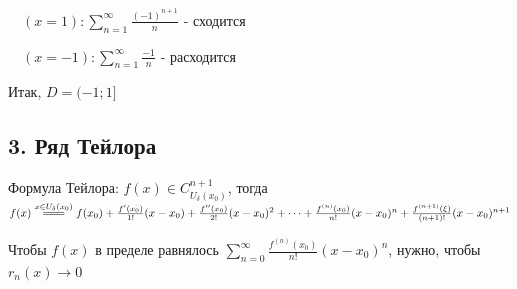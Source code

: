 \documentclass[12pt]{article}
\begin{document}
    $\quad (x = 1): \sum_{n = 1}^\infty \frac{(-1)^{n + 1}}{n}$ - сходится

    $\quad (x = -1): \sum_{n = 1}^\infty \frac{-1}{n}$ - расходится

    Итак, $D = (-1; 1]$

    \subsection{3. Ряд Тейлора}

    \Mem Формула Тейлора: $f(x) \in C^{n + 1}_{U_\delta (x_0)}$, тогда $f(x) \overset{x \in U_\delta (x_0)}{=\joinrel=\joinrel=} f(x_0) + 
    \frac{f^\prime (x_0)}{1!} (x - x_0) + \frac{f^{\prime\prime} (x_0)}{2!} (x - x_0)^2 + \dots + \frac{f^{(n)} (x_0)}{n!} (x - x_0)^n + \frac{f^{(n + 1)} (\xi)}{(n + 1)!} (x - x_0)^{n + 1}$

    Чтобы $f(x)$ в пределе равнялось $\sum_{n = 0}^\infty \frac{f^{(n)}(x_0)}{n!} (x - x_0)^n$, нужно, чтобы $r_n(x) \to 0$
\end{document}
